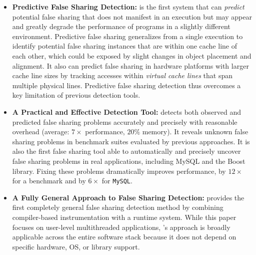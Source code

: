 \begin{itemize}


\item
\textbf{Predictive False Sharing Detection:} \Predator{} is the first system that can \emph{predict} potential false sharing that does
not manifest in an execution but may appear and greatly degrade the
performance of programs in a slightly different
environment. Predictive false sharing generalizes from a single
execution to identify potential false sharing instances that are
within one cache line of each other, which could be exposed by slight
changes in object placement and alignment. It also can predict false sharing
in hardware platforms with larger cache line sizes by tracking
accesses within \emph{virtual cache lines} that span multiple physical
lines. Predictive false sharing detection thus overcomes a key
limitation of previous detection tools.



\item
\textbf{A Practical and Effective Detection Tool:} \Predator{} detects both observed and predicted false sharing 
problems accurately and precisely with reasonable overhead (average:
$7\times$ performance, $20\%$ memory).  It reveals unknown false
sharing problems in benchmark suites evaluated by previous approaches. It
is also the first false sharing tool able to automatically and precisely uncover
false sharing problems in real applications, including 
MySQL and the Boost library. Fixing these problems 
dramatically improves performance, by $12\times$ for a benchmark and by $6\times$ for \texttt{MySQL}.


\item
\textbf{A Fully General Approach to False Sharing Detection:} \Predator{} provides the first completely general false sharing detection method by
combining compiler-based instrumentation with a runtime system. While this
paper focuses on user-level multithreaded applications, \Predator{}'s
approach is broadly applicable across the entire software stack
because it does not depend on specific hardware, OS, or library
support.


\end{itemize}
